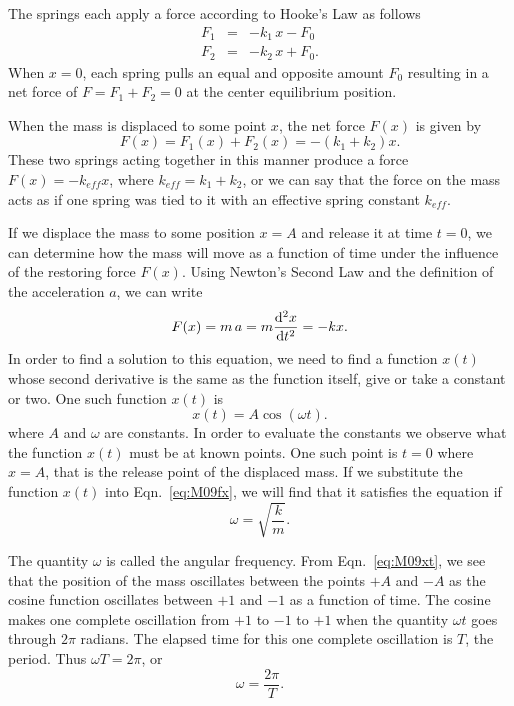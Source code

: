 The springs each apply a force according to Hooke's Law as follows
\begin{eqnarray*}
  F_1 & = & -k_1\, x - F_0\\
  F_2 & = & -k_2\, x + F_0.
\end{eqnarray*}
When $x = 0$, each spring pulls an equal and opposite amount $F_0$ resulting in a net force of $F = F_1 + F_2 = 0$ at the center equilibrium position.

When the mass is displaced to some point $x$, the net force $F(x)$ is given by
\[
F(x) = F_1(x) + F_2(x) = -(k_1 + k_2) x.
\]
These two springs acting together in this manner produce a force $F(x) = -k_{eff} x$, where $k_{eff} = k_1 + k_2$, or we can say that the force on the mass acts as if one spring was tied to it with an effective spring constant $k_{eff}$.

If we displace the mass to some position $x = A$ and release it at time $t = 0$, we can determine how the mass will move as a function of time under the influence of the restoring force $F(x)$.  Using Newton's Second Law and the definition of the acceleration $a$, we can write
\begin{equation}
  \label{eq:M09fx}
  F(x) = m\, a = m \frac{{\rm d}^{2}x}{{\rm d} t^{2}} = -k x.
\end{equation}
In order to find a solution to this equation, we need to find a function $x(t)$ whose second derivative is the same as the function itself, give or take a constant or two.  One such function $x(t)$ is
\begin{equation}
  \label{eq:M09xt}
  x(t) = A \cos\left(\omega t \right).
\end{equation}
where $A$ and $\omega$ are constants.  In order to evaluate the constants we observe what the function $x(t)$ must be at known points.  One such point is $t = 0$ where $x = A$, that is the release point of the displaced mass.  If we substitute the function $x(t)$ into Eqn.~\ref{eq:M09fx}, we will find that it satisfies the equation if
\begin{equation}
  \label{eq:M09omega}
  \omega = \sqrt{\frac{k}{m}}.
\end{equation}

The quantity $\omega$ is called the angular frequency.  From Eqn.~\ref{eq:M09xt}, we see that the position of the mass oscillates between the points $+A$ and $-A$ as the cosine function oscillates between $+1$ and $-1$ as a function of time.  The cosine makes one complete oscillation from $+1$ to $-1$ to $+1$ when the quantity $\omega t$ goes through $2\pi$ radians.  The elapsed time for this one complete oscillation is $T$, the period.  Thus $\omega T = 2 \pi$, or
\[
\omega = \frac{2\pi}{T}.
\]

